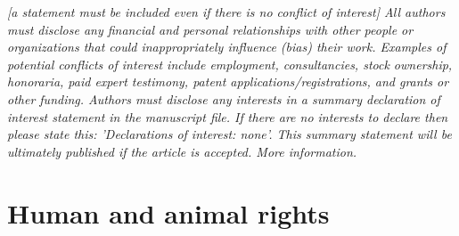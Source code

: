 \documentclass[11pt, letterpaper]{article}
\begin{document}
\textit{[a statement must be included even if there is no conflict of interest] \linebreak
All authors must disclose any financial and personal relationships with other people or organizations that could inappropriately influence (bias) their work. Examples of potential conflicts of interest include employment, consultancies, stock ownership, honoraria, paid expert testimony, patent applications/registrations, and grants or other funding. Authors must disclose any interests in a summary declaration of interest statement in the manuscript file. If there are no interests to declare then please state this: 'Declarations of interest: none'. This summary statement will be ultimately published if the article is accepted. More information.}

\section{Human and animal rights}
\end{document}
